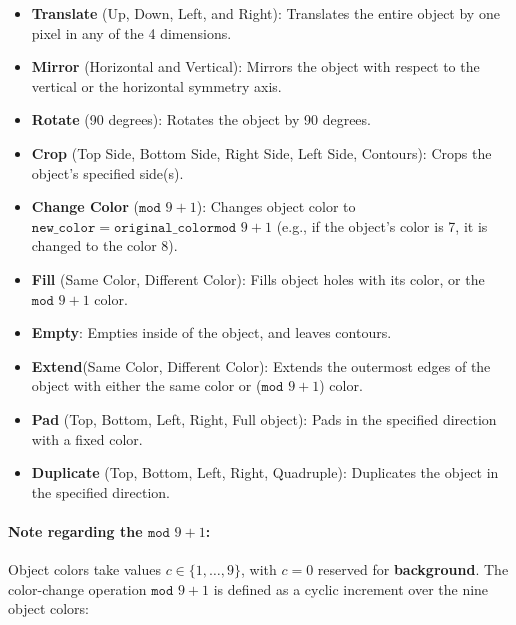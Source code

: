 \begin{itemize}
    \item \textbf{Translate} (Up, Down, Left, and Right): Translates the entire object by one pixel in any of the 4 dimensions. 
    
    \item \textbf{Mirror} (Horizontal and Vertical): Mirrors the object with respect to the vertical or the horizontal symmetry axis. 
    
    \item \textbf{Rotate} (90 degrees): Rotates the object by 90 degrees.
    
    \item \textbf{Crop} (Top Side, Bottom Side, Right Side, Left Side, Contours): Crops the object's specified side(s). 
    
    \item \textbf{Change Color} ($\texttt{mod } 9 + 1$): Changes object color to $\texttt{new\_color} = \texttt{original\_color} \texttt{mod } 9 + 1$ (e.g., if the object's color is 7, it is changed to the color 8).
    
    \item \textbf{Fill} (Same Color, Different Color): Fills object holes with its color, or the $\texttt{mod } 9 + 1$ color.
    
    \item \textbf{Empty}: Empties inside of the object, and leaves contours. 
    
    \item \textbf{Extend}(Same Color, Different Color): Extends the outermost edges of the object with either the same color or ($\texttt{mod } 9 + 1$) color. 
    
    \item \textbf{Pad} (Top, Bottom, Left, Right, Full object): Pads in the specified direction with a fixed color.
    
    \item \textbf{Duplicate} (Top, Bottom, Left, Right, Quadruple): Duplicates the object in the specified direction. 
\end{itemize}

\paragraph{Note regarding the $\texttt{mod } 9 + 1$:} 

Object colors take values $c \in \{1, \dots, 9\}$, with $c = 0$ reserved for \textbf{background}. The color-change operation $\texttt{mod } 9 + 1$ is defined as a cyclic increment over the nine object colors:

